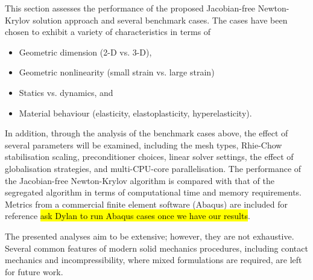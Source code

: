 \documentclass[sn-mathphys,Numbered]{sn-jnl}%
\begin{document}
%	

This section assesses the performance of the proposed Jacobian-free Newton-Krylov solution approach and several benchmark cases.
The cases have been chosen to exhibit a variety of characteristics in terms of
\begin{itemize}
	\item Geometric dimension (2-D vs. 3-D),
	\item Geometric nonlinearity (small strain vs. large strain)
	\item Statics vs. dynamics, and
	\item Material behaviour (elasticity, elastoplasticity, hyperelasticity).
\end{itemize}

In addition, through the analysis of the benchmark cases above, the effect of several parameters will be examined, including the mesh types, Rhie-Chow stabilisation scaling, preconditioner choices, linear solver settings, the effect of globalisation strategies, and multi-CPU-core parallelisation.
The performance of the Jacobian-free Newton-Krylov algorithm is compared with that of the segregated algorithm in terms of computational time and memory requirements.
Metrics from a commercial finite element software (Abaqus) are included for reference \hl{ask Dylan to run Abaqus cases once we have our results}.

The presented analyses aim to be extensive; however, they are not exhaustive.
Several common features of modern solid mechanics procedures, including contact mechanics and incompressibility, where mixed formulations are required, are left for future work.
\end{document}
